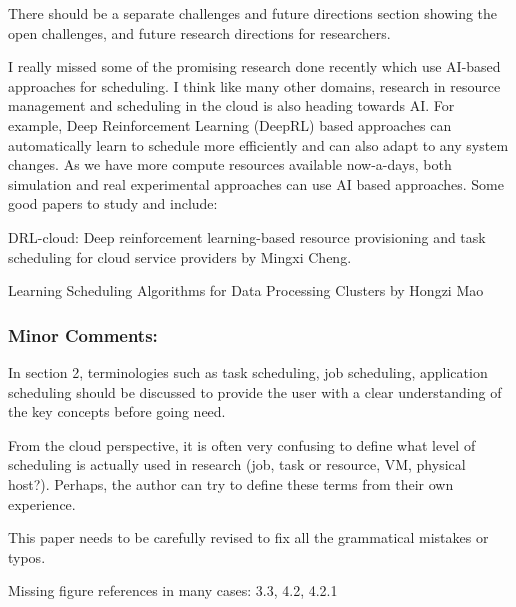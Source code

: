 
There should be a separate challenges and future directions section
showing the open challenges, and future research directions for
researchers.


I really missed some of the promising research done recently which use
AI-based approaches for scheduling. I think like many other domains,
research in resource management and scheduling in the cloud is also
heading towards AI. For example, Deep Reinforcement Learning (DeepRL)
based approaches can automatically learn to schedule more efficiently
and can also adapt to any system changes. As we have more compute
resources available now-a-days, both simulation and real experimental
approaches can use AI based approaches. Some good papers to study and
include:



DRL-cloud: Deep reinforcement learning-based resource provisioning and
task scheduling for cloud service providers by Mingxi Cheng.


Learning Scheduling Algorithms for Data Processing Clusters by Hongzi Mao



\subsubsection{Minor Comments:}

In section 2, terminologies such as task scheduling, job scheduling,
application scheduling should be discussed to provide the user with a
clear understanding of the key concepts before going need. 


From the
cloud perspective, it is often very confusing to define what level of
scheduling is actually used in research (job, task or resource, VM,
physical host?). Perhaps, the author can try to define these terms
from their own experience.


This paper needs to be carefully revised to fix all the grammatical
mistakes or typos.


Missing figure references in many cases: 3.3, 4.2, 4.2.1




